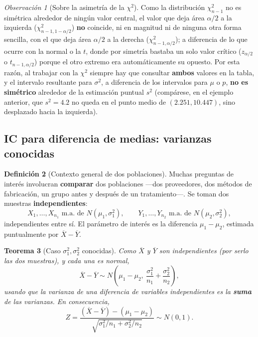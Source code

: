 \documentclass[11pt,a4paper]{article}
\theoremstyle{plain}
\newtheorem{teorema}{Teorema}[section]
\theoremstyle{definition}
\newtheorem{definicion}[teorema]{Definición}
\theoremstyle{remark}
\newtheorem{observacion}[teorema]{Observación}
\begin{document}
\begin{observacion}[Sobre la asimetría de la $\chi^2$]
Como la distribución $\chi^2_{n-1}$ no es simétrica alrededor de ningún valor central, el valor que deja área $\alpha/2$ a la izquierda ($\chi^2_{n-1,1-\alpha/2}$) \textbf{no} coincide, ni en magnitud ni de ninguna otra forma sencilla, con el que deja área $\alpha/2$ a la derecha ($\chi^2_{n-1,\alpha/2}$); a diferencia de lo que ocurre con la normal o la $t$, donde por simetría bastaba un solo valor crítico ($z_{\alpha/2}$ o $t_{n-1,\alpha/2}$) porque el otro extremo era automáticamente su opuesto. Por esta razón, al trabajar con la $\chi^2$ siempre hay que consultar \textbf{ambos} valores en la tabla, y el intervalo resultante para $\sigma^2$, a diferencia de los intervalos para $\mu$ o $p$, \textbf{no es simétrico} alrededor de la estimación puntual $s^2$ (compárese, en el ejemplo anterior, que $s^2=4.2$ no queda en el punto medio de $(2.251,10.447)$, sino desplazado hacia la izquierda).
\end{observacion}

\subsection{IC para diferencia de medias: varianzas conocidas}

\begin{definicion}[Contexto general de dos poblaciones]
Muchas preguntas de interés involucran \textbf{comparar} dos poblaciones —dos proveedores, dos métodos de fabricación, un grupo antes y después de un tratamiento—. Se toman dos muestras \textbf{independientes}:
\[
X_1,\dots,X_{n_1} \text{ m.a.\ de } N(\mu_1,\sigma_1^2), \qquad Y_1,\dots,Y_{n_2} \text{ m.a.\ de } N(\mu_2,\sigma_2^2),
\]
independientes entre sí. El parámetro de interés es la diferencia $\mu_1-\mu_2$, estimada puntualmente por $\overline X-\overline Y$.
\end{definicion}

\begin{teorema}[Caso $\sigma_1^2,\sigma_2^2$ conocidas]
Como $\overline X$ y $\overline Y$ son independientes (por serlo las dos muestras), y cada una es normal,
\[
\overline X-\overline Y \sim N\left(\mu_1-\mu_2,\ \frac{\sigma_1^2}{n_1}+\frac{\sigma_2^2}{n_2}\right),
\]
usando que la varianza de una diferencia de variables independientes es la \textbf{suma} de las varianzas. En consecuencia,
\[
Z = \frac{(\overline X-\overline Y)-(\mu_1-\mu_2)}{\sqrt{\sigma_1^2/n_1+\sigma_2^2/n_2}} \sim N(0,1).
\]
\end{teorema}
\end{document}
